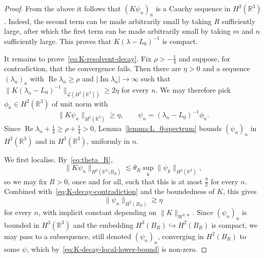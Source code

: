 \documentclass[11pt]{article}
\DeclareMathOperator{\real}{Re}
\DeclareMathOperator{\imag}{Im}
\begin{document}
\begin{proof}
  From the above it follows that \((K\psi_{n})_{n}\) is a Cauchy
  sequence in \(H^{2}(\mathbb{R}^{3})\). Indeed, the second term can
  be made arbitrarily small by taking \(R\) sufficiently large, after
  which the first term can be made arbitrarily small by taking \(m\)
  and \(n\) sufficiently large. This proves that
  \(K(\lambda - L_{0})^{-1}\) is compact.

  It remains to prove~\eqref{eq:K-resolvent-decay}. Fix
  \(\rho > -\frac{1}{4}\) and suppose, for contradiction, that the
  convergence fails. Then there are \(\eta > 0\) and a sequence
  \((\lambda_{n})_{n}\) with \(\real \lambda_{n} \geq \rho\) and
  \(|\imag \lambda_{n}| \to \infty\) such that
  \(\|K(\lambda_{n} -
  L_{0})^{-1}\|_{\mathcal{L}(H^{2}(\mathbb{R}^{3}))} \geq 2\eta\) for
  every \(n\). We may therefore pick
  \(\phi_{n} \in H^{2}(\mathbb{R}^{3})\) of unit norm with
  \begin{equation}\label{eq:K-decay-contradiction}
    \|K\psi_{n}\|_{H^{2}(\mathbb{R}^{3})} \geq \eta,
    \qquad \psi_{n} = (\lambda_{n} - L_{0})^{-1}\phi_{n}.
  \end{equation}
  Since \(\real \lambda_{n} + \frac{1}{4} \geq \rho + \frac{1}{4} > 0\),
  Lemma~\ref{lemma:L_0-spectrum} bounds \((\psi_{n})_{n}\) in
  \(H^{2}(\mathbb{R}^{3})\) and in \(H^{3}(\mathbb{R}^{3})\),
  uniformly in \(n\).

  We first localise. By~\eqref{eq:theta_R},
  \begin{equation*}
    \|K\psi_{n}\|_{H^{2}(\mathbb{R}^{3} \setminus B_{R})}
    \lesssim \theta_{R}\sup_{k}\|\psi_{k}\|_{H^{2}(\mathbb{R}^{3})},
  \end{equation*}
  so we may fix \(R > 0\), once and for all, such that this is at most
  \(\frac{\eta}{2}\) for every \(n\). Combined
  with~\eqref{eq:K-decay-contradiction} and the boundedness of \(K\),
  this gives
  \begin{equation}\label{eq:K-decay-local-lower-bound}
    \|\psi_{n}\|_{H^{2}(B_{R})} \gtrsim \eta
  \end{equation}
  for every \(n\), with implicit constant depending on
  \(\|K\|_{W^{2,\infty}}\). Since \((\psi_{n})_{n}\) is bounded in
  \(H^{3}(\mathbb{R}^{3})\) and the embedding
  \(H^{3}(B_{R}) \hookrightarrow H^{2}(B_{R})\) is compact, we may
  pass to a subsequence, still denoted \((\psi_{n})_{n}\), converging
  in \(H^{2}(B_{R})\) to some \(\psi\), which
  by~\eqref{eq:K-decay-local-lower-bound} is non-zero.


\end{proof}
\end{document}
